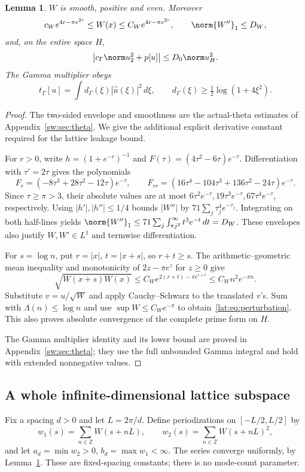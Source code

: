 \documentclass[11pt,a4paper]{article}
\numberwithin{equation}{section}
\newtheorem{lemma}[theorem]{Lemma}
\theoremstyle{definition}\newtheorem{definition}[theorem]{Definition}
\theoremstyle{remark}\newtheorem{remark}[theorem]{Remark}
\begin{document}
\begin{lemma}\label{lat:lem:theta}
$W$ is smooth, positive and even. Moreover
\[
 c_We^{4r-\pi e^{2r}}\le W(x)\le C_We^{4r-\pi e^{2r}},\qquad
 \norm{W''}_1\le D_W,
\]
and, on the entire space $H$,
\begin{equation}\label{lat:eq:perturbation}
 \big|c_\Gamma\norm u_2^2+p[u]\big|\le D_0\norm u_H^2.
\end{equation}
The Gamma multiplier obeys
\begin{equation}\label{lat:eq:gamma}
 t_\Gamma[u]=\int d_\Gamma(\xi)|\widehat u(\xi)|^2\,d\xi,
 \qquad d_\Gamma(\xi)\ge\tfrac12\log(1+4\xi^2).
\end{equation}
\end{lemma}
\begin{proof}
The two-sided envelope and smoothness are the actual-theta estimates of Appendix~\ref{sw:sec:theta}. We give the additional explicit derivative constant required for the lattice leakage bound.

For $r>0$, write $h=(1+e^{-r})^{-1}$ and
$F(\tau)=(4\tau^2-6\tau)e^{-\tau}$. Differentiation with
$\tau'=2\tau$ gives the polynomials
\[
 F_r=(-8\tau^3+28\tau^2-12\tau)e^{-\tau},\qquad
 F_{rr}=(16\tau^4-104\tau^3+136\tau^2-24\tau)e^{-\tau}.
\]
Since $\tau\ge\pi>3$, their absolute values are at most
$6\tau^2e^{-\tau},19\tau^3e^{-\tau},67\tau^4e^{-\tau}$, respectively.
Using $|h'|,|h''|\le1/4$ bounds $|W''|$ by
$71\sum_j\tau_j^4e^{-\tau_j}$. Integrating on both half-lines yields
$\norm{W''}_1\le71\sum_j\int_{\pi j^2}^\infty t^3e^{-t}\,dt=D_W$.
These envelopes also justify $W,W'\in L^1$ and termwise differentiation.

For $s=\log n$, put $r=|x|$, $t=|x+s|$, so $r+t\ge s$.
The arithmetic--geometric mean inequality and monotonicity of
$2z-\pi e^z$ for $z\ge0$ give
\[
 \sqrt{W(x+s)W(x)}\le C_We^{2(r+t)-\pi e^{r+t}}
                         \le C_Wn^2e^{-\pi n}.
\]
Substitute $v=u/\sqrt W$ and apply Cauchy--Schwarz to the translated
$v$'s. Sum with $\Lambda(n)\le\log n$ and use
$\sup W\le C_We^{-\pi}$ to obtain~\eqref{lat:eq:perturbation}.
This also proves absolute convergence of the complete prime form on $H$.

The Gamma multiplier identity and its lower bound are proved in Appendix~\ref{sw:sec:theta}; they use the full unbounded Gamma integral and hold with extended nonnegative values.
\end{proof}

\subsection{A whole infinite-dimensional lattice subspace}
Fix a spacing $d>0$ and let $L=2\pi/d$. Define periodizations on
$[-L/2,L/2]$ by
\[
 w_1(s)=\sum_{n\in\mathbb Z}W(s+nL),\qquad
 w_2(s)=\sum_{n\in\mathbb Z}W(s+nL)^2,
\]
and let $a_d=\min w_2>0$, $b_d=\max w_1<\infty$.
The series converge uniformly, by Lemma~\ref{lat:lem:theta}.
These are fixed-spacing constants; there is no mode-count parameter.
\end{document}
